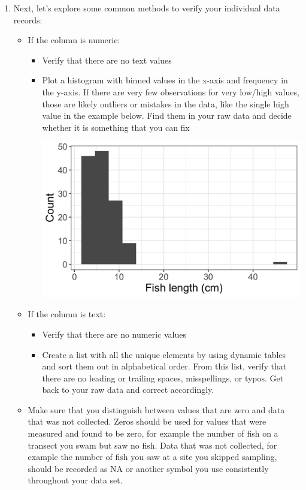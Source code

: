 \documentclass[
]{book}
\begin{document}
\begin{enumerate}
\def\labelenumi{\arabic{enumi}.}
\setcounter{enumi}{2}
\item
  Next, let's explore some common methods to verify your individual data records:

  \begin{itemize}
  \item
    If the column is numeric:

    \begin{itemize}
    \item
      Verify that there are no text values
    \item
      Plot a histogram with binned values in the x-axis and frequency in the y-axis. If there are very few observations for very low/high values, those are likely outliers or mistakes in the data, like the single high value in the example below. Find them in your raw data and decide whether it is something that you can fix

      \includegraphics{images/M2S2_image3_data_cleaning_histogram.png}
    \end{itemize}
  \item
    If the column is text:

    \begin{itemize}
    \item
      Verify that there are no numeric values
    \item
      Create a list with all the unique elements by using dynamic tables and sort them out in alphabetical order. From this list, verify that there are no leading or trailing spaces, misspellings, or typos. Get back to your raw data and correct accordingly.
    \end{itemize}
  \item
    Make sure that you distinguish between values that are zero and data that was not collected. Zeros should be used for values that were measured and found to be zero, for example the number of fish on a transect you swam but saw no fish. Data that was not collected, for example the number of fish you saw at a site you skipped sampling, should be recorded as NA or another symbol you use consistently throughout your data set.
  \end{itemize}
\end{enumerate}
\end{document}
